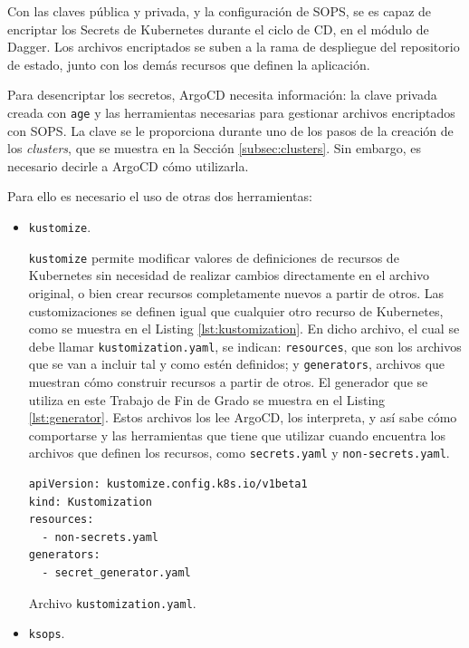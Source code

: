 Con las claves pública y privada, y la configuración de SOPS, se es capaz de encriptar los Secrets de Kubernetes durante el ciclo de CD, en el módulo de Dagger. Los archivos encriptados se suben a la rama de despliegue del repositorio de estado, junto con los demás recursos que definen la aplicación.

Para desencriptar los secretos, ArgoCD necesita información: la clave privada creada con \texttt{age} y las herramientas necesarias para gestionar archivos encriptados con SOPS. La clave se le proporciona durante uno de los pasos de la creación de los \textit{clusters}, que se muestra en la Sección \ref{subsec:clusters}. Sin embargo, es necesario decirle a ArgoCD cómo utilizarla.

Para ello es necesario el uso de otras dos herramientas:

\begin{itemize}
  \item \texttt{kustomize}\cite{kustomize}.

    \texttt{kustomize} permite modificar valores de definiciones de recursos de Kubernetes sin necesidad de realizar cambios directamente en el archivo original, o bien crear recursos completamente nuevos a partir de otros. Las customizaciones se definen igual que cualquier otro recurso de Kubernetes, como se muestra en el Listing \ref{lst:kustomization}. En dicho archivo, el cual se debe llamar \texttt{kustomization.yaml}, se indican: \texttt{resources}, que son los archivos que se van a incluir tal y como estén definidos; y \texttt{generators}, archivos que muestran cómo construir recursos a partir de otros. El generador que se utiliza en este Trabajo de Fin de Grado se muestra en el Listing \ref{lst:generator}. Estos archivos los lee ArgoCD, los interpreta, y así sabe cómo comportarse y las herramientas que tiene que utilizar cuando encuentra los archivos que definen los recursos, como \texttt{secrets.yaml} y \texttt{non-secrets.yaml}.

\begin{listing}[!ht]
  \begin{verbatim}
apiVersion: kustomize.config.k8s.io/v1beta1
kind: Kustomization
resources:
  - non-secrets.yaml
generators:
  - secret_generator.yaml
\end{verbatim}
\caption{Archivo \texttt{kustomization.yaml}.}
\label{lst:kustomization}
\end{listing}

  \item \texttt{ksops}\cite{ksops}.


\end{itemize}
